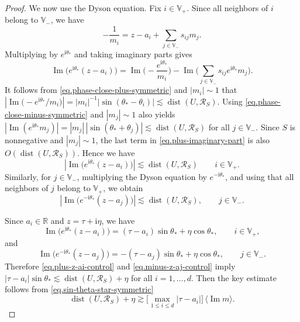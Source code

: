 \documentclass[11pt,twoside, a4paper]{article}
\numberwithin{equation}{section}
\numberwithin{figure}{section}
\theoremstyle{plain} %
\theoremstyle{definition}
\theoremstyle{remark}
\newcommand{\1} {\mspace{1 mu}}
\newcommand{\2} {\mspace{2 mu}}
\DeclareMathOperator{\im}{Im}
\DeclareMathOperator{\dist}{dist}
\begin{document}
\begin{proof}
    We now use the Dyson equation. Fix \(i\in\mathbb V_+\). Since all neighbors of \(i\)
    belong to \(\mathbb V_-\), we have
    \[
        -\frac1{m_i}
        =
        z-a_i+\sum_{j\in\mathbb V_-}s_{ij}m_j .
    \]
    Multiplying by \(e^{\mathrm i\theta_*}\) and taking imaginary parts gives
    \begin{equation}\label{eq.plus-imaginary-part}
        \im\bigl(e^{\mathrm i\theta_*}(z-a_i)\bigr)
        =
        \im\Big(-\frac{e^{\mathrm i\theta_*}}{m_i}\Big)
        -
        \im\Bigg(
            \sum_{j\in\mathbb V_-}s_{ij}e^{\mathrm i\theta_*}m_j
        \Bigg).
    \end{equation}
    It follows from \eqref{eq.phase-close-plus-symmetric} and $|m_i|\sim 1$ that
    \smallskip
    $
        \left|
        \im\big(-e^{\mathrm i\theta_*}/m_i\big)
        \right|
        =
        |m_i|^{-1}|\sin(\theta_*-\theta_i)|
        \lesssim \dist(U,\mathscr{R}_{S}) .
    $
    Using \eqref{eq.phase-close-minus-symmetric} and $|m_j|\sim 1$ also yields
    $
        \left|
        \im(e^{\mathrm i\theta_*}m_j)
        \right|
        =
        |m_j|\,|\sin(\theta_*+\theta_j)|
        \lesssim \dist(U,\mathscr{R}_{S})
    $
    for all $j\in\mathbb{V}_-$.
    Since \(S\) is nonnegative and \(|m_j|\sim1\), the last term in
    \eqref{eq.plus-imaginary-part} is also \(O(\dist(U,\mathscr{R}_{S}))\). Hence we have
    \begin{equation}\label{eq.plus-z-ai-control}
        \left|
        \im\bigl(e^{\mathrm i\theta_*}(z-a_i)\bigr)
        \right|
        \lesssim \dist(U,\mathscr{R}_{S})
        \qquad i\in\mathbb V_+ .
    \end{equation}
    Similarly, for \(j\in\mathbb V_-\), multiplying the Dyson equation by \(e^{-\mathrm i\theta_*}\),
    and using that all neighbors of \(j\) belong to \(\mathbb V_+\), we obtain
    \begin{equation}\label{eq.minus-z-aj-control}
        \left|
        \im\bigl(e^{-\mathrm i\theta_*}(z-a_j)\bigr)
        \right|
        \lesssim \dist(U,\mathscr{R}_{S}),
        \qquad j\in\mathbb V_- .
    \end{equation}
    
    Since \(a_i\in\mathbb R\) and \(z=\tau+\mathrm i\eta\), we have
    \[
        \im\bigl(e^{\mathrm i\theta_*}(z-a_i)\bigr)
        =
        (\tau-a_i)\sin\theta_*+\eta\cos\theta_*,
        \qquad i\in\mathbb V_+,
    \]
    and
    \[
        \im\bigl(e^{-\mathrm i\theta_*}(z-a_j)\bigr)
        =
        -(\tau-a_j)\sin\theta_*+\eta\cos\theta_*,
        \qquad j\in\mathbb V_- .
    \]
    Therefore \eqref{eq.plus-z-ai-control} and \eqref{eq.minus-z-aj-control} imply
    $
        |\tau-a_i|\sin\theta_*
        \lesssim
        \dist(U,\mathscr{R}_{S})+\eta
    $
    for all $i=1,\dots,d$.
    Then the key estimate follows from \eqref{eq.sin-theta-star-symmetric}
    \begin{equation}\label{eq.delta-eta-controls-max-tau-ai}
        \dist(U,\mathscr{R}_{S})+\eta
        \gtrsim
        \bigl[\max_{1\le i\le d}|\tau-a_i|\bigr]\,
        \langle\im m\rangle .
    \end{equation}



\end{proof}
\end{document}
